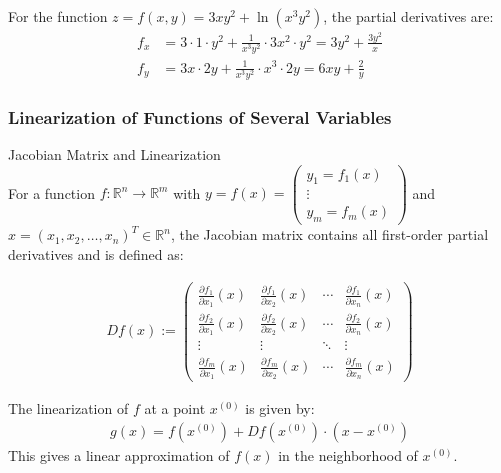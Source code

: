 \begin{example}
For the function $z = f(x,y) = 3xy^2 + \ln(x^3y^2)$, the partial derivatives are:
\begin{align*}
f_x &= 3 \cdot 1 \cdot y^2 + \frac{1}{x^3y^2} \cdot 3x^2 \cdot y^2 = 3y^2 + \frac{3y^2}{x}\\
f_y &= 3x \cdot 2y + \frac{1}{x^3y^2} \cdot x^3 \cdot 2y = 6xy + \frac{2}{y}
\end{align*}
\end{example}

\subsubsection{Linearization of Functions of Several Variables}

\begin{definition}{Jacobian Matrix and Linearization}\\
For a function $f: \mathbb{R}^n \rightarrow \mathbb{R}^m$ with $y = f(x) = \begin{pmatrix} y_1 = f_1(x) \\ \vdots \\ y_m = f_m(x) \end{pmatrix}$ and $x = (x_1, x_2, \ldots, x_n)^T \in \mathbb{R}^n$, the Jacobian matrix contains all first-order partial derivatives and is defined as:

\begin{align*}
Df(x) := \begin{pmatrix} 
\frac{\partial f_1}{\partial x_1}(x) & \frac{\partial f_1}{\partial x_2}(x) & \cdots & \frac{\partial f_1}{\partial x_n}(x) \\
\frac{\partial f_2}{\partial x_1}(x) & \frac{\partial f_2}{\partial x_2}(x) & \cdots & \frac{\partial f_2}{\partial x_n}(x) \\
\vdots & \vdots & \ddots & \vdots \\
\frac{\partial f_m}{\partial x_1}(x) & \frac{\partial f_m}{\partial x_2}(x) & \cdots & \frac{\partial f_m}{\partial x_n}(x)
\end{pmatrix}
\end{align*}

The linearization of $f$ at a point $x^{(0)}$ is given by:
\begin{align*}
g(x) = f(x^{(0)}) + Df(x^{(0)}) \cdot (x - x^{(0)})
\end{align*}
This gives a linear approximation of $f(x)$ in the neighborhood of $x^{(0)}$.
\end{definition}

